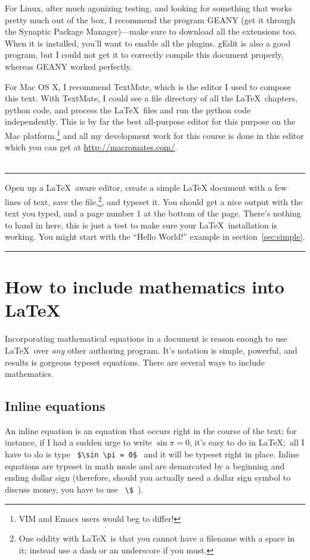 For Linux, after much agonizing testing, and looking for something that works pretty much out of the box, I recommend the program GEANY (get it through the Synaptic Package Manager)---make sure to download all the extensions too. When it is installed, you'll want to enable all the plugins. gEdit is also a good program, but I could not get it to correctly compile this document properly, whereas GEANY worked perfectly. 

For Mac OS X, I recommend TextMate, which is the editor I used to compose this text. With TextMate, I could see a file directory of all the \LaTeX\ chapters, python code, and process the \LaTeX\ files and run the python code independently. This is by far the best all-purpose editor for this purpose on the Mac platform.\footnote{VIM and Emacs users would beg to differ!} 
and all my development work for this course is done in this editor which you can get at \href{http://macromates.com/}{http://macromates.com/}.\\
\\
\rule{\textwidth}{1pt}
\begin{exercise}\label{exer:latex1}	
Open up a \LaTeX\ aware editor, create a simple LaTeX document with a few lines of text, save the file,\footnote{One oddity with \LaTeX\ is that you cannot have a filename with a space in it; instead use a dash or an underscore if you must.}, and typeset it. 
You should get a nice output with the text you typed, and a page number 1 at the bottom of the page. 
There's nothing to hand in here, this is just a test to make sure your \LaTeX\ installation is working. You might start with the ``Hello World!'' example in section~\ref{sec:simple}. 
\end{exercise}
\rule{\textwidth}{1pt}
\section{How to include mathematics into \LaTeX\ }\label{sec:math}
Incorporating mathematical equations in a document is reason enough to use \LaTeX\ over \textit{any} other authoring program. It's notation is simple, powerful, and results is gorgeous typeset equations. There are several ways to include mathematics. 
\subsection{Inline equations}
An inline equation is an equation that occurs right in the course of the text; for instance, if I had a sudden urge to write $\sin \pi = 0$, it's easy to do in \LaTeX;\ all I have to do is type \verb! $\sin \pi = 0$ ! and it will be typeset right in place. Inline equations are typeset in math mode and are demarcated by a beginning and ending dollar sign (therefore, should you actually need a dollar sign symbol to discuss money, you have to use \verb! \$ !).


